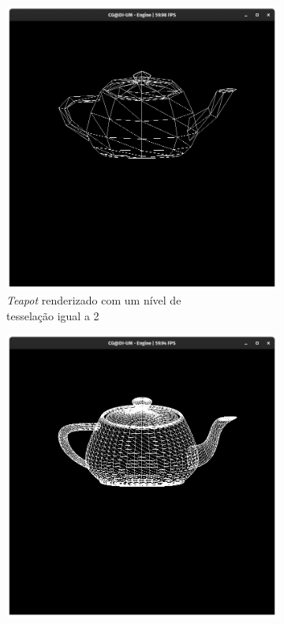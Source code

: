 \documentclass[a4paper, 11pt]{article}
\begin{document}
\begin{figure}[H]
\centering
\begin{subfigure}{.5\textwidth}
    \centering
    \includegraphics[width=\textwidth]{img/teapot2.png}
    \caption{\textit{Teapot} renderizado com um nível de \\ tesselação igual a 2}
\end{subfigure}%
\begin{subfigure}{.5\textwidth}
    \centering
    \includegraphics[width=\textwidth]{img/teapot10.png}

\end{subfigure}
\end{figure}
\end{document}
